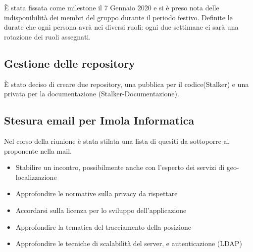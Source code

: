 \documentclass[a4paper, oneside, dvipsnames, table]{article}
\begin{document}
È stata fissata come milestone il 7 Gennaio 2020 e si è preso nota delle indisponibilità dei membri del gruppo durante il periodo festivo. 
Definite le durate che ogni persona avrà nei diversi ruoli: ogni due settimane ci sarà una rotazione dei ruoli assegnati. \\

\subsection{Gestione delle repository}
È stato deciso di creare due repository, una pubblica per il codice(Stalker) e una privata per la documentazione (Stalker-Documentazione). \\

\subsection{Stesura email per Imola Informatica}
Nel corso della riunione è stata stilata una lista di quesiti da sottoporre al proponente nella mail. 
\begin{itemize}
\item Stabilire un incontro, possibilmente anche con l’esperto dei servizi di geo-localizzazione
\item Approfondire le normative sulla privacy da rispettare
\item Accordarsi sulla licenza per lo sviluppo dell'applicazione
\item Approfondire la tematica del tracciamento della posizione
\item Approfondire le tecniche di scalabilità del server, e autenticazione (LDAP)
\end{itemize} 

\clearpage


\end{document}
